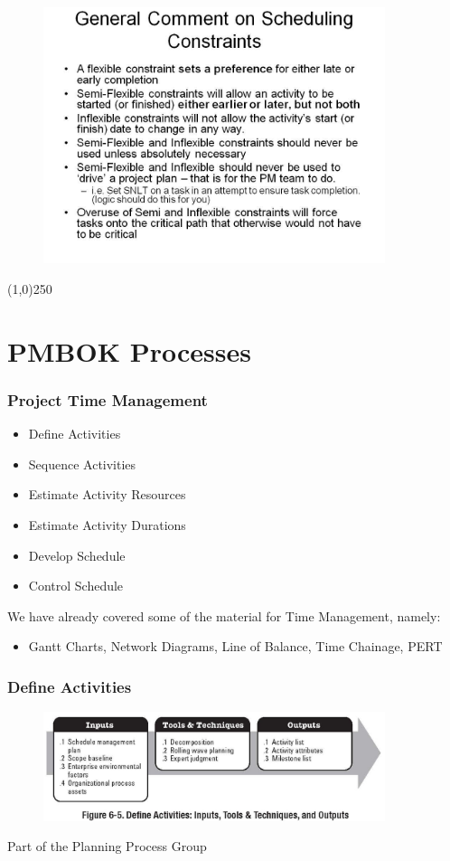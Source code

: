 \begin{frame}
\begin{figure}
	\centering
		\includegraphics[width = 10.0cm]{oldnotes/Slide188.jpg}
\end{figure}
\end{frame}
\begin{center}\line(1,0){250}\end{center}



\section{PMBOK Processes}


\begin{frame}
\frametitle{Project Time Management}
\begin{itemize}
	\item Define Activities
	\item Sequence Activities
	\item Estimate Activity Resources
	\item Estimate Activity Durations
	\item Develop Schedule
	\item Control Schedule
\end{itemize}

We have already covered some of the material for Time Management, namely:
\begin{itemize}
	\item Gantt Charts, Network Diagrams, Line of Balance, Time Chainage, PERT 
\end{itemize}

\end{frame}




\begin{frame}
\frametitle{Define Activities}
\begin{figure}
	\centering
		\includegraphics[width = 10cm]{images/Fig6-5.jpg}
	\label{fig:6-5}
\end{figure}
Part of the Planning Process Group
\end{frame}





